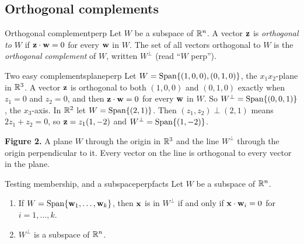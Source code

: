 \documentclass[11pt]{article}
\begin{document}
\subsection*{Orthogonal complements}

\begin{defn}{Orthogonal complement}{perp}
Let $W$ be a subspace of $\mathbb{R}^n$. A vector $\mathbf{z}$ is \emph{orthogonal to $W$} if $\mathbf{z}\cdot\mathbf{w}=0$ for every $\mathbf{w}$ in $W$. The set of all vectors orthogonal to $W$ is the \emph{orthogonal complement} of $W$, written $W^{\perp}$ (read ``$W$ perp'').
\end{defn}

\begin{exmp}{Two easy complements}{planeperp}
Let $W=\operatorname{Span}\{(1,0,0),(0,1,0)\}$, the $x_1x_2$-plane in $\mathbb{R}^3$. A vector $\mathbf{z}$ is orthogonal to both $(1,0,0)$ and $(0,1,0)$ exactly when $z_1=0$ and $z_2=0$, and then $\mathbf{z}\cdot\mathbf{w}=0$ for every $\mathbf{w}$ in $W$. So $W^{\perp}=\operatorname{Span}\{(0,0,1)\}$, the $x_3$-axis. In $\mathbb{R}^2$ let $W=\operatorname{Span}\{(2,1)\}$. Then $(z_1,z_2)\perp(2,1)$ means $2z_1+z_2=0$, so $\mathbf{z}=z_1(1,-2)$ and $W^{\perp}=\operatorname{Span}\{(1,-2)\}$.
\end{exmp}

\begin{center}
\end{center}

\noindent\textbf{Figure 2.} A plane $W$ through the origin in $\mathbb{R}^3$ and the line $W^{\perp}$ through the origin perpendicular to it. Every vector on the line is orthogonal to every vector in the plane.

\begin{thm}{Testing membership, and a subspace}{perpfacts}
Let $W$ be a subspace of $\mathbb{R}^n$.
\begin{enumerate}[label=(\alph*),itemsep=1pt]
  \item If $W=\operatorname{Span}\{\mathbf{w}_1,\dots,\mathbf{w}_k\}$, then $\mathbf{x}$ is in $W^{\perp}$ if and only if $\mathbf{x}\cdot\mathbf{w}_i=0$ for $i=1,\dots,k$.
  \item $W^{\perp}$ is a subspace of $\mathbb{R}^n$.
\end{enumerate}
\end{thm}
\end{document}
